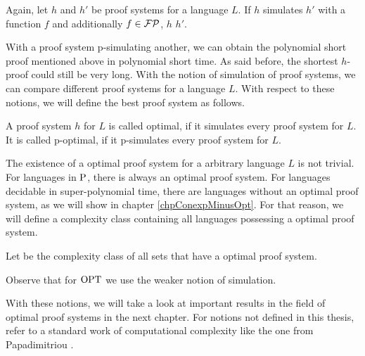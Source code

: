   \begin{definition}
   Again, let \(h\) and \(h'\) be proof systems for a language \(L\). If \(h\) simulates \(h'\) with a function \(f\) and additionally \(f \in \FP\), \(h\)  \(h'\).
  \end{definition}

  With a proof system p-simulating another, we can obtain the polynomial short proof mentioned above in polynomial short time. As said before, the shortest \(h\)-proof could still be very long. With the notion of simulation of proof systems, we can compare different proof systems for a language \(L\). With respect to these notions, we will define the best proof system as follows.

  \begin{definition}
    A proof system \(h\) for \(L\) is called optimal, if it simulates every proof system for \(L\). It is called p-optimal, if it p-simulates every proof system for \(L\).
  \end{definition}

  The existence of a optimal proof system for a arbitrary language \(L\) is not trivial. For languages in \(\P\), there is always an optimal proof system. For languages decidable in super-polynomial time, there are languages without an optimal proof system, as we will show in chapter \ref{chpConexpMinusOpt}. For that reason, we will define a complexity class containing all languages possessing a optimal proof system.

  \begin{definition}
    Let  be the complexity class of all sets that have a optimal proof system.
  \end{definition}

  Observe that for \(\OPT\) we use the weaker notion of simulation.

  With these notions, we will take a look at important results in the field of optimal proof systems in the next chapter. For notions not defined in this thesis, refer to a standard work of computational complexity like the one from Papadimitriou \cite{Pap94}.

